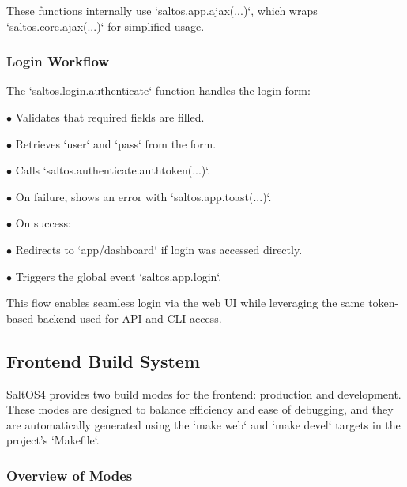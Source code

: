 \documentclass[a4paper]{article}
\begin{document}
These functions internally use `saltos.app.ajax(...)`, which wraps `saltos.core.ajax(...)` for simplified usage.

\hypertarget{toc25}{}
\subsubsection{Login Workflow}

The `saltos.login.authenticate` function handles the login form:

\begin{compactitem}
\item[\color{myblue}$\bullet$] Validates that required fields are filled.
\item[\color{myblue}$\bullet$] Retrieves `user` and `pass` from the form.
\item[\color{myblue}$\bullet$] Calls `saltos.authenticate.authtoken(...)`.
\item[\color{myblue}$\bullet$] On failure, shows an error with `saltos.app.toast(...)`.
\item[\color{myblue}$\bullet$] On success:
\item[\color{myblue}$\bullet$] Redirects to `app/dashboard` if login was accessed directly.
\item[\color{myblue}$\bullet$] Triggers the global event `saltos.app.login`.
\end{compactitem}

This flow enables seamless login via the web UI while leveraging the same token-based backend used for API and CLI access.

\hypertarget{toc26}{}
\subsection{Frontend Build System}

SaltOS4 provides two build modes for the frontend: production and development. These modes are designed to balance efficiency and ease of debugging, and they are automatically generated using the `make web` and `make devel` targets in the project’s `Makefile`.

\hypertarget{toc27}{}
\subsubsection{Overview of Modes}
\end{document}
